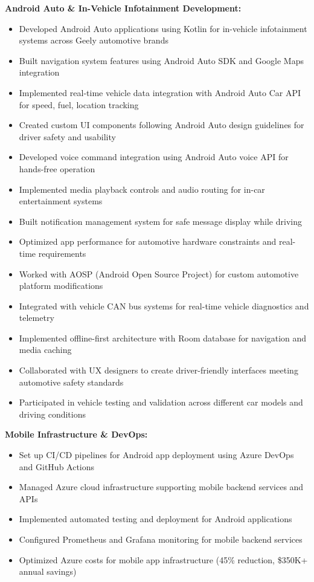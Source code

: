 \documentclass[11pt,a4paper]{article}
\begin{document}
\textbf{Android Auto \& In-Vehicle Infotainment Development:}
\begin{itemize}[leftmargin=*, itemsep=2pt]
\item Developed Android Auto applications using Kotlin for in-vehicle infotainment systems across Geely automotive brands
\item Built navigation system features using Android Auto SDK and Google Maps integration
\item Implemented real-time vehicle data integration with Android Auto Car API for speed, fuel, location tracking
\item Created custom UI components following Android Auto design guidelines for driver safety and usability
\item Developed voice command integration using Android Auto voice API for hands-free operation
\item Implemented media playback controls and audio routing for in-car entertainment systems
\item Built notification management system for safe message display while driving
\item Optimized app performance for automotive hardware constraints and real-time requirements
\item Worked with AOSP (Android Open Source Project) for custom automotive platform modifications
\item Integrated with vehicle CAN bus systems for real-time vehicle diagnostics and telemetry
\item Implemented offline-first architecture with Room database for navigation and media caching
\item Collaborated with UX designers to create driver-friendly interfaces meeting automotive safety standards
\item Participated in vehicle testing and validation across different car models and driving conditions
\end{itemize}

\textbf{Mobile Infrastructure \& DevOps:}
\begin{itemize}[leftmargin=*, itemsep=2pt]
\item Set up CI/CD pipelines for Android app deployment using Azure DevOps and GitHub Actions
\item Managed Azure cloud infrastructure supporting mobile backend services and APIs
\item Implemented automated testing and deployment for Android applications
\item Configured Prometheus and Grafana monitoring for mobile backend services
\item Optimized Azure costs for mobile app infrastructure (45\% reduction, \$350K+ annual savings)
\end{itemize}
\end{document}

